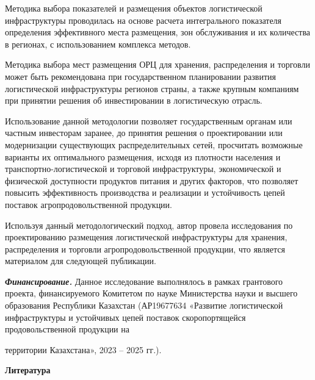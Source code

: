 Методика выбора показателей и размещения объектов логистической
инфраструктуры проводилась на основе расчета интегрального показателя
определения эффективного места размещения, зон обслуживания и их
количества в регионах, с использованием комплекса методов.

Методика выбора мест размещения ОРЦ для хранения, распределения и
торговли может быть рекомендована при государственном планировании
развития логистической инфраструктуры регионов страны, а также крупным
компаниям при принятии решения об инвестировании в логистическую
отрасль.

Использование данной методологии позволяет государственным органам или
частным инвесторам заранее, до принятия решения о проектировании или
модернизации существующих распределительных сетей, просчитать возможные
варианты их оптимального размещения, исходя из плотности населения и
транспортно-логистической и торговой инфраструктуры, экономической и
физической доступности продуктов питания и других факторов, что
позволяет повысить эффективность производства и реализации и
устойчивость цепей поставок агропродовольственной продукции.

Используя данный методологический подход, автор провела исследования по
проектированию размещения логистической инфраструктуры для хранения,
распределения и торговли агропродовольственной продукции, что является
материалом для следующей публикации.

\emph{{\bfseries Финансирование.}} Данное исследование выполнялось в рамках
грантового проекта, финансируемого Комитетом по науке Министерства науки
и высшего образования Республики Казахстан (АР19677634 «Развитие
логистической инфраструктуры и устойчивых цепей поставок скоропортящейся
продовольственной продукции на

территории Казахстана», 2023 -- 2025 гг.).

{\bfseries Литература}

